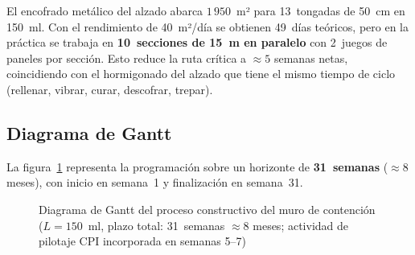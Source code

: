 \begin{notabox}
  El encofrado metálico del alzado abarca $1\,950$~m² para 13~tongadas de
  50~cm en 150~ml.
  Con el rendimiento de 40~m²/día se obtienen 49~días teóricos, pero en la
  práctica se trabaja en \textbf{10~secciones de 15~m en paralelo} con
  2~juegos de paneles por sección.
  Esto reduce la ruta crítica a $\approx 5$ semanas netas, coincidiendo
  con el hormigonado del alzado que tiene el mismo tiempo de ciclo
  (rellenar, vibrar, curar, descofrar, trepar).
\end{notabox}

\subsection{Diagrama de Gantt}
\label{subsec:gantt}

La figura~\ref{fig:gantt_muro} representa la programación sobre un horizonte
de \textbf{31~semanas} ($\approx 8$ meses), con inicio en semana~1 y
finalización en semana~31.

\begin{figure}[H]
\centering
{}
\caption{Diagrama de Gantt del proceso constructivo del muro de contención
         ($L = 150$~ml, plazo total: 31~semanas $\approx 8$ meses;
          actividad de pilotaje CPI incorporada en semanas 5--7)}
\label{fig:gantt_muro}
\end{figure}
